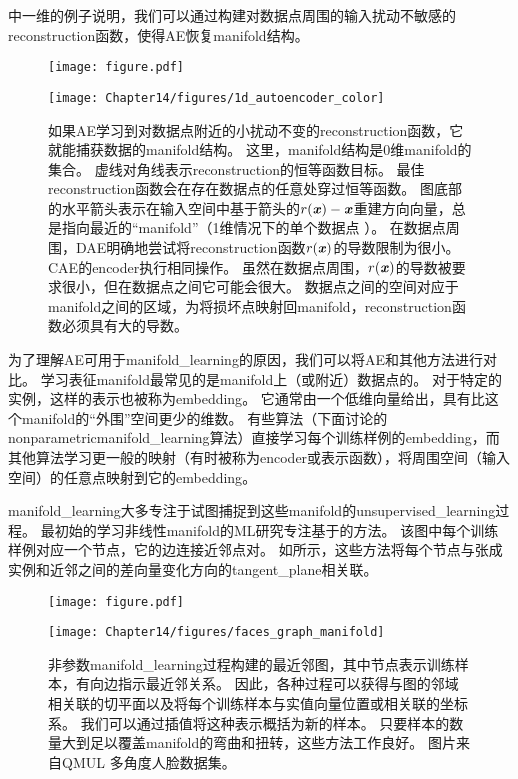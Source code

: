 中一维的例子说明，我们可以通过构建对数据点周围的输入扰动不敏感的\gls{reconstruction}函数，使得\gls{AE}恢复\gls{manifold}结构。


\begin{figure}[!htb]
\ifOpenSource
\centerline{\texttt{[image: figure.pdf]}}
\else
\centerline{\texttt{[image: Chapter14/figures/1d\_autoencoder\_color]}}
\fi
\caption{如果\gls{AE}学习到对数据点附近的小扰动不变的\gls{reconstruction}函数，它就能捕获数据的\gls{manifold}结构。
这里，\gls{manifold}结构是0维\gls{manifold}的集合。
虚线对角线表示\gls{reconstruction}的恒等函数目标。 
最佳\gls{reconstruction}函数会在存在数据点的任意处穿过恒等函数。
图底部的水平箭头表示在输入空间中基于箭头的$r(\boldsymbol{\mathit{x}})-\boldsymbol{\mathit{x}}$重建方向向量，总是指向最近的``\gls{manifold}''（1维情况下的单个数据点 ）。
在数据点周围，\gls{DAE}明确地尝试将\gls{reconstruction}函数$r(\boldsymbol{\mathit{x}})$的导数限制为很小。
\gls{CAE}的\gls{encoder}执行相同操作。
虽然在数据点周围，$r(\boldsymbol{\mathit{x}})$的导数被要求很小，但在数据点之间它可能会很大。
数据点之间的空间对应于\gls{manifold}之间的区域，为将损坏点映射回\gls{manifold}，\gls{reconstruction}函数必须具有大的导数。
} \label{fig:chap14_1d_autoencoder_color}
\end{figure}


为了理解\gls{AE}可用于\gls{manifold_learning}的原因，我们可以将\gls{AE}和其他方法进行对比。
学习表征\gls{manifold}最常见的是\gls{manifold}上（或附近）数据点的。
对于特定的实例，这样的表示也被称为\gls{embedding}。
它通常由一个低维向量给出，具有比这个\gls{manifold}的``外围''空间更少的维数。
有些算法（下面讨论的\gls{nonparametric}\gls{manifold_learning}算法）直接学习每个训练样例的\gls{embedding}，而其他算法学习更一般的映射（有时被称为\gls{encoder}或表示函数），将周围空间（输入空间）的任意点映射到它的\gls{embedding}。


\gls{manifold_learning}大多专注于试图捕捉到这些\gls{manifold}的\gls{unsupervised_learning}过程。
最初始的学习非线性\gls{manifold}的\gls{ML}研究专注基于的方法。
该图中每个训练样例对应一个节点，它的边连接近邻点对。
如所示，这些方法\citep{Scholkopf98,Roweis2000-lle-small,Tenenbaum2000-isomap,Brand2003-small,Belkin+Niyogi-2003,Donoho+Carrie-03,Weinberger04a-small,SNE-nips15-small,VanDerMaaten08-small}将每个节点与张成实例和近邻之间的差向量变化方向的\gls{tangent_plane}相关联。

\begin{figure}[!htb]
\ifOpenSource
\centerline{\texttt{[image: figure.pdf]}}
\else
\centerline{\texttt{[image: Chapter14/figures/faces\_graph\_manifold]}}
\fi
\caption{非参数\gls{manifold_learning}过程构建的最近邻图，其中节点表示训练样本，有向边指示最近邻关系。
因此，各种过程可以获得与图的邻域相关联的切平面以及将每个训练样本与实值向量位置或相关联的坐标系。
我们可以通过插值将这种表示概括为新的样本。
只要样本的数量大到足以覆盖\gls{manifold}的弯曲和扭转，这些方法工作良好。 
图片来自QMUL 多角度人脸数据集\citep{Gong-et-al-2000}。
}
\label{fig:chap14_faces_graph_manifold}
\end{figure}

